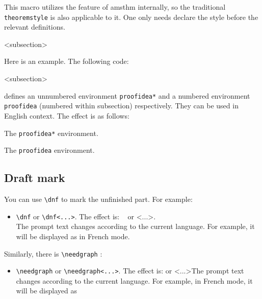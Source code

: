 \documentclass[allowbf,puretext]{colorart}
\theoremstyle{basic}
\theoremstyle{emphasis}
\theoremstyle{simple}
\newenvironment{tip}[1][Tip]{%
    \begin{tcolorbox}[breakable,
        enhanced,
        width = \textwidth,
        colback = paper, colbacktitle = paper,
        colframe = gray!50, boxrule=0.2mm,
        coltitle = black,
        fonttitle = \sffamily,
        attach boxed title to top left = {yshift=-\tcboxedtitleheight/2, xshift=.5cm},
        boxed title style = {boxrule=0pt, colframe=paper},
        before skip = 0.3cm,
        after skip = 0.3cm,
        top = 3mm,
        bottom = 3mm,
        title={\scshape\sffamily #1}]%
}{\end{tcolorbox}}
\begin{document}
\medskip
\begin{tip}
    This macro utilizes the feature of \textsf{amsthm} internally, so the traditional \texttt{theoremstyle} is also applicable to it. One only needs declare the style before the relevant definitions.
\end{tip}

<subsection>

\bigskip
Here is an example. The following code:
\begin{code}
  <subsection>
\end{code}
defines an unnumbered environment \lstinline|proofidea*| and a numbered environment \lstinline|proofidea| (numbered within subsection) respectively. They can be used in English context. The effect is as follows:

\begin{proofidea*}
    The \lstinline|proofidea*| environment.
\end{proofidea*}

\begin{proofidea}
    The \lstinline|proofidea| environment.
\end{proofidea}

\bigskip
\subsection{Draft mark}

You can use \lstinline|\dnf| to mark the unfinished part. For example:
\begin{itemize}
    \item \lstinline|\dnf| or \lstinline|\dnf<...>|. The effect is: \dnf~ or \dnf<...>. \\The prompt text changes according to the current language. For example, it will be displayed as  in French mode.
\end{itemize}

Similarly, there is \lstinline|\needgraph| : 
\begin{itemize}
    \item \lstinline|\needgraph| or \lstinline|\needgraph<...>|. The effect is: \needgraph or \needgraph<...>The prompt text changes according to the current language. For example, in French mode, it will be displayed as 
\end{itemize}
\end{document}
